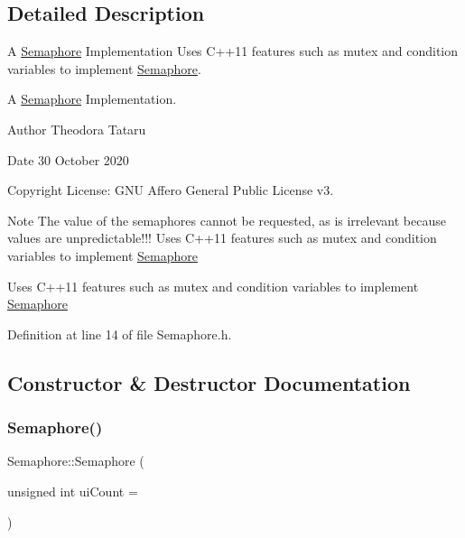 \subsection{Detailed Description}
A \hyperlink{class_semaphore}{Semaphore} Implementation Uses C++11 features such as mutex and condition variables to implement \hyperlink{class_semaphore}{Semaphore}. 

A \hyperlink{class_semaphore}{Semaphore} Implementation.

\begin{DoxyAuthor}{Author}
Theodora Tataru 
\end{DoxyAuthor}
\begin{DoxyDate}{Date}
30 October 2020 
\end{DoxyDate}
\begin{DoxyCopyright}{Copyright}
License\+: G\+NU Affero General Public License v3.
\end{DoxyCopyright}
\begin{DoxyNote}{Note}
The value of the semaphores cannot be requested, as is irrelevant because values are unpredictable!!! Uses C++11 features such as mutex and condition variables to implement \hyperlink{class_semaphore}{Semaphore}
\end{DoxyNote}
Uses C++11 features such as mutex and condition variables to implement \hyperlink{class_semaphore}{Semaphore} 

Definition at line 14 of file Semaphore.\+h.



\subsection{Constructor \& Destructor Documentation}
\mbox{\label{class_semaphore_a0d9290d316636875ca85d1d78950a817}} 
\subsubsection{\texorpdfstring{Semaphore()}{Semaphore()}}
{\footnotesize\ttfamily Semaphore\+::\+Semaphore (\begin{DoxyParamCaption}\item[{unsigned int}]{ui\+Count = {} }\end{DoxyParamCaption})\hspace{0.3cm}{\ttfamily [inline]}}



